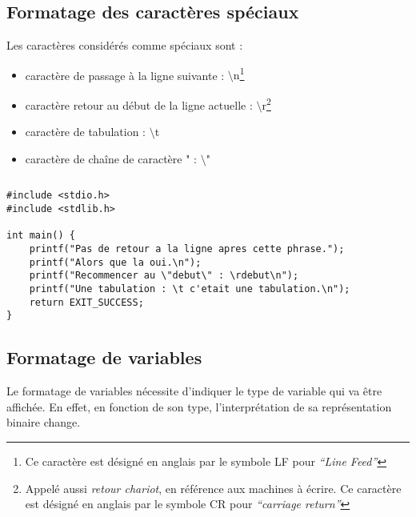 \documentclass[../../../main.tex]{subfiles}
\begin{document}
\subsection{Formatage des caractères spéciaux}
\label{sub:formatage_des_caract_res_sp_ciaux}
Les caractères considérés comme spéciaux sont :
\begin{itemize}
	\item caractère de passage à la ligne suivante : \textsf{$\setminus$n}\footnote{Ce caractère est désigné en anglais par le symbole \textsf{LF} pour \textit{``Line Feed''}}
	\item caractère retour au début de la ligne actuelle : \textsf{$\setminus$r}\footnote{Appelé aussi \textit{retour chariot}, en référence aux machines à écrire. Ce caractère est désigné en anglais par le symbole \textsf{CR} pour \textit{``carriage return''}}
	\item caractère de tabulation : \textsf{$\setminus$t}
	\item caractère de chaîne de caractère \textsf{"} : \textsf{$\setminus$"}
\end{itemize}
\begin{lstlisting}[title=Exemples]
\end{lstlisting}
\begin{verbatim}
#include <stdio.h>
#include <stdlib.h>

int main() {
	printf("Pas de retour a la ligne apres cette phrase.");
	printf("Alors que la oui.\n");
	printf("Recommencer au \"debut\" : \rdebut\n");
	printf("Une tabulation : \t c'etait une tabulation.\n");
	return EXIT_SUCCESS;
}
\end{verbatim}
\subsection{Formatage de variables}
\label{sub:formatage_de_variables}
Le formatage de variables nécessite d'indiquer le type de variable qui va être affichée. En effet, en fonction de son type, l'interprétation de sa représentation binaire change.
 
\end{document}
